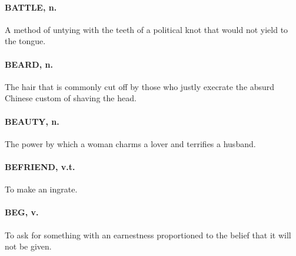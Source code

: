 \documentclass[11pt]{article}
\begin{document}
\paragraph{BATTLE, n.}  A method of untying with the teeth of a political knot
that would not yield to the tongue.

\paragraph{BEARD, n.}  The hair that is commonly cut off by those who justly
execrate the absurd Chinese custom of shaving the head.

\paragraph{BEAUTY, n.}  The power by which a woman charms a lover and terrifies a
husband.

\paragraph{BEFRIEND, v.t.}  To make an ingrate.

\paragraph{BEG, v.}  To ask for something with an earnestness proportioned to the
belief that it will not be given.
\end{document}
